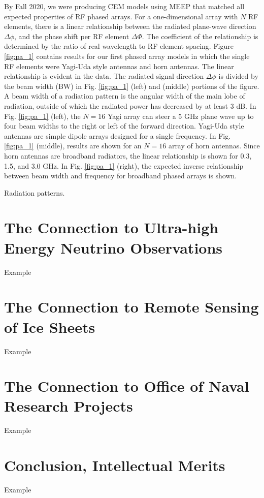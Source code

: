 \documentclass[../../main.tex]{subfiles}
\begin{document}
By Fall 2020, we were producing CEM models using MEEP that matched all expected properties of RF phased arrays.  For a one-dimensional array with $N$ RF elements, there is a linear relationship between the radiated plane-wave direction $\Delta \phi$, and the phase shift per RF element $\Delta \Phi$.  The coefficient of the relationship is determined by the ratio of real wavelength to RF element spacing.  Figure \ref{fig:pa_1} contains results for our first phased array models in which the single RF elements were Yagi-Uda style antennas and horn antennas.  The linear relationship is evident in the data.  The radiated signal direction $\Delta \phi$ is divided by the beam width (BW) in Fig. \ref{fig:pa_1} (left) and (middle) portions of the figure.  A beam width of a radiation pattern is the angular width of the main lobe of radiation, outside of which the radiated power has decreased by at least 3 dB.  In Fig. \ref{fig:pa_1} (left), the $N=16$ Yagi array can steer a 5 GHz plane wave up to four beam widths to the right or left of the forward direction.  Yagi-Uda style antennas are simple dipole arrays designed for a single frequency.  In Fig. \ref{fig:pa_1} (middle), results are shown for an $N=16$ array of horn antennas.  Since horn antennas are broadband radiators, the linear relationship is shown for 0.3, 1.5, and 3.0 GHz.  In Fig. \ref{fig:pa_1} (right), the expected inverse relationship between beam width and frequency for broadband phased arrays is shown. \\ \vspace{2.5mm}

Radiation patterns.

%

\section{The Connection to Ultra-high Energy Neutrino Observations}
\label{sec:askaryan}

Example

\section{The Connection to Remote Sensing of Ice Sheets}
\label{sec:cresis}

Example

\section{The Connection to Office of Naval Research Projects}
\label{sec:onr}

Example

\section{Conclusion, Intellectual Merits}
\label{sec:conc_im}

Example
\end{document}
